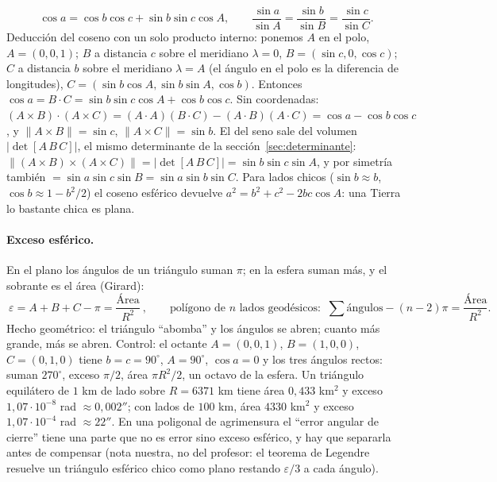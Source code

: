 \begin{resultado}
\[
  \cos a=\cos b\cos c+\sin b\sin c\cos A,\qquad
  \frac{\sin a}{\sin A}=\frac{\sin b}{\sin B}=\frac{\sin c}{\sin C}.
\]
Deducción del coseno con un solo producto interno: ponemos \(A\) en el polo, \(A=(0,0,1)\);
\(B\) a distancia \(c\) sobre el meridiano \(\lambda=0\), \(B=(\sin c,0,\cos c)\); \(C\)
a distancia \(b\) sobre el meridiano \(\lambda=A\) (el ángulo en el polo es la diferencia
de longitudes), \(C=(\sin b\cos A,\sin b\sin A,\cos b)\). Entonces
\(\cos a=B\cdot C=\sin b\sin c\cos A+\cos b\cos c\). Sin coordenadas:
\((A\times B)\cdot(A\times C)=(A\cdot A)(B\cdot C)-(A\cdot B)(A\cdot C)=\cos a-\cos b\cos c\),
y \(\|A\times B\|=\sin c\), \(\|A\times C\|=\sin b\). El del seno sale del volumen
\(|\det[A\,B\,C]|\), el mismo determinante de la sección~\ref{sec:determinante}:
\(\|(A\times B)\times(A\times C)\|=|\det[A\,B\,C]|=\sin b\sin c\sin A\), y por simetría
también \(=\sin a\sin c\sin B=\sin a\sin b\sin C\). Para lados chicos
(\(\sin b\approx b\), \(\cos b\approx1-b^2/2\)) el coseno esférico devuelve
\(a^2=b^2+c^2-2bc\cos A\): una Tierra lo bastante chica es plana.
\end{resultado}

\paragraph{Exceso esférico.} En el plano los ángulos de un triángulo suman \(\pi\); en la
esfera suman más, y el sobrante es el área (Girard):
\[
  \boxed{\ \varepsilon=A+B+C-\pi=\frac{\text{Área}}{R^2}\ },\qquad
  \text{polígono de } n \text{ lados geodésicos: }\ \sum\text{ángulos}-(n-2)\pi=\frac{\text{Área}}{R^2}.
\]
Hecho geométrico: el triángulo ``abomba'' y los ángulos se abren; cuanto más grande, más
se abren. Control: el octante \(A=(0,0,1)\), \(B=(1,0,0)\), \(C=(0,1,0)\) tiene
\(b=c=90^\circ\), \(A=90^\circ\), \(\cos a=0\) y los tres ángulos rectos: suman
\(270^\circ\), exceso \(\pi/2\), área \(\pi R^2/2\), un octavo de la esfera. Un triángulo
equilátero de \(1\) km de lado sobre \(R=6371\) km tiene área \(0{,}433\) km\(^2\) y exceso
\(1{,}07\cdot10^{-8}\) rad \(\approx0{,}002''\); con lados de \(100\) km, área
\(4330\) km\(^2\) y exceso \(1{,}07\cdot10^{-4}\) rad \(\approx22''\). En una poligonal de
agrimensura el ``error angular de cierre'' tiene una parte que no es error sino exceso
esférico, y hay que separarla antes de compensar (nota nuestra, no del profesor: el teorema
de Legendre resuelve un triángulo esférico chico como plano restando \(\varepsilon/3\) a
cada ángulo).

